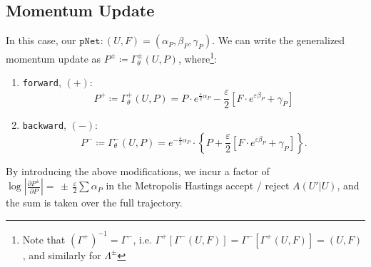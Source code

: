 \documentclass[a4paper,11pt]{article}
\begin{document}
\subsection{\label{sec:momentum-update}Momentum Update}
%
In this case, our $\texttt{pNet}: (U, F) = (\alpha_{P},
\beta_{P}, \gamma_{P})$.
%
We can write the generalized momentum update as $P^{\pm} \coloneqq \Gamma_{\theta}^{\pm}(U, P)$, where\footnote{Note that $\left(\Gamma^{+}\right)^{-1} = \Gamma^{-}$, i.e. $\Gamma^{+}\left[\Gamma^{-}(U, F)\right] = \Gamma^{-}\left[\Gamma^{+}(U, F)\right] = (U, F)$, and similarly for $\Lambda^{\pm}$}:
%
%
%
\begin{enumerate}
    \item \texttt{forward}, $(+)$:
    \begin{equation}
        P^{+} \coloneqq \Gamma_{\theta}^{+}(U, P) = P \cdot e^{\frac{\varepsilon}{2} \alpha_{P}} - \frac{\varepsilon}{2}\left[ F \cdot e^{\varepsilon \beta_{P}} + \gamma_{P} \right]
    \end{equation}
    \item \texttt{backward}, $(-)$:
    \begin{equation}
        P^{-} \coloneqq \Gamma_{\theta}^{-}(U, P) = e^{-\frac{\varepsilon}{2} \alpha_{P}} \cdot \left\{P + \frac{\varepsilon}{2} \left[ F \cdot e^{\varepsilon \beta_{P}} + \gamma_{P} \right] \right\}.
    \end{equation}
\end{enumerate}
%
By introducing the above modifications, we incur a factor of 
%
$\log\left|\frac{\partial P^{\pm}}{\partial P}\right| = \, \pm \, \frac{\varepsilon}{2}\sum \alpha_{P}$
%
in the Metropolis Hastings accept / reject $A(U'|U)$, and the sum is taken over the full trajectory.
%
\end{document}
